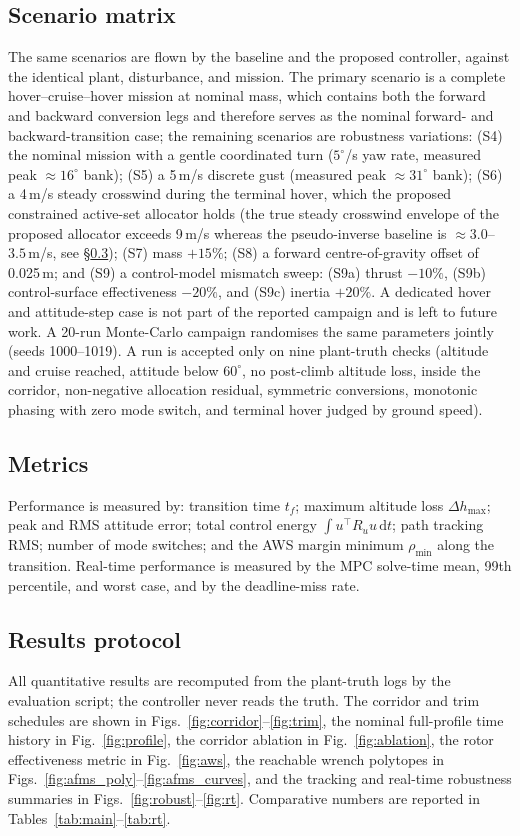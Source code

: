 \documentclass[preprint,3p,11pt]{elsarticle}
\begin{document}
\subsection{Scenario matrix}\label{sec:scenarios}
The same scenarios are flown by the baseline and the proposed controller,
against the identical plant, disturbance, and mission. The primary scenario is
a complete hover--cruise--hover mission at nominal mass, which contains both
the forward and backward conversion legs and therefore serves as the nominal
forward- and backward-transition case; the remaining scenarios are robustness
variations: (S4) the nominal mission with a gentle coordinated turn
($5^\circ$/s yaw rate, measured peak $\approx 16^\circ$ bank); (S5) a 5\,m/s
discrete gust (measured peak $\approx 31^\circ$ bank); (S6) a 4\,m/s steady
crosswind during the terminal hover, which the proposed constrained
active-set allocator holds (the true steady crosswind envelope of the
proposed allocator exceeds 9\,m/s whereas the pseudo-inverse baseline is
$\approx 3.0$--$3.5$\,m/s, see \S\ref{sec:results}); (S7) mass
$+15\%$; (S8) a forward
centre-of-gravity offset of 0.025\,m; and (S9) a control-model mismatch sweep:
(S9a) thrust $-10\%$, (S9b) control-surface effectiveness $-20\%$, and (S9c)
inertia $+20\%$. A dedicated hover and attitude-step case is not part of the
reported campaign and is left to future work. A 20-run Monte-Carlo campaign
randomises the same parameters jointly (seeds 1000--1019). A run is accepted
only on nine plant-truth checks (altitude and cruise reached, attitude below
$60^\circ$, no post-climb altitude loss, inside the corridor, non-negative
allocation residual, symmetric conversions, monotonic phasing with zero mode
switch, and terminal hover judged by ground speed).

\subsection{Metrics}\label{sec:metrics}
Performance is measured by: transition time $t_f$; maximum altitude loss
$\Delta h_{\max}$; peak and RMS attitude error; total control energy
$\int u^\top R_u u\,\mathrm dt$; path tracking RMS; number of mode switches;
and the AWS margin minimum $\rho_{\min}$ along the transition. Real-time
performance is measured by the MPC solve-time mean, 99th percentile, and
worst case, and by the deadline-miss rate.

\subsection{Results protocol}\label{sec:results}
All quantitative results are recomputed from the plant-truth logs by the
evaluation script; the controller never reads the truth. The corridor and
trim schedules are shown in Figs.~\ref{fig:corridor}--\ref{fig:trim}, the
nominal full-profile time history in Fig.~\ref{fig:profile}, the corridor
ablation in Fig.~\ref{fig:ablation}, the rotor effectiveness metric in
Fig.~\ref{fig:aws}, the reachable wrench polytopes in
Figs.~\ref{fig:afms_poly}--\ref{fig:afms_curves}, and the tracking and
real-time robustness summaries in
Figs.~\ref{fig:robust}--\ref{fig:rt}. Comparative numbers are reported in
Tables~\ref{tab:main}--\ref{tab:rt}.
\end{document}
